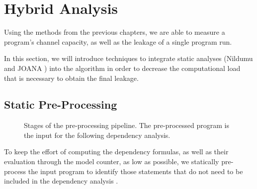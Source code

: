 \chapter{Hybrid Analysis}

Using the methods from the previous chapters, we are able to measure a program's channel capacity, as well as the leakage of a single program run.

In this section, we will introduce techniques to integrate static analyses (Nildumu \cite{bechberger18} and JOANA \cite{hammer09}) into the algorithm in order to decrease the computational load that is necessary to obtain the final leakage.

\section{Static Pre-Processing}
\begin{figure}
    \centering
    \caption{Stages of the pre-processing pipeline. The pre-processed program is the input for the following dependency analysis.}
    \label{fig:pp}
\end{figure}

To keep the effort of computing the dependency formulas, as well as their evaluation through the model counter, as low as possible, we statically pre-process the input program to identify those statements that do not need to be included in the dependency analysis .

